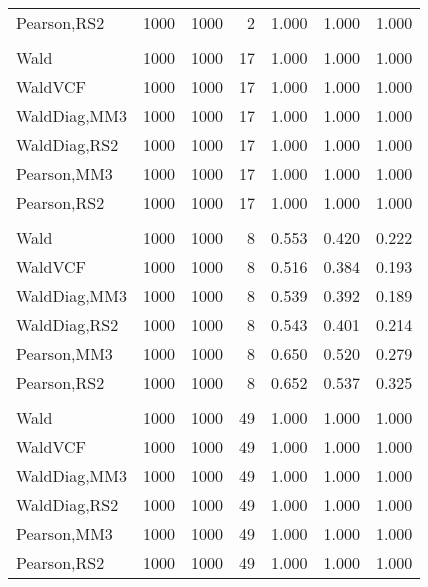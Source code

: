 \documentclass[
]{article}
\begin{document}
\begin{table}[H]
{\begin{tabular}[t]{lrrrrrr}
\hspace{1em}Pearson,RS2 & 1000 & 1000 & 2 & 1.000 & 1.000 & 1.000\\
\addlinespace[0.3em]
\multicolumn{7}{l}{\textbf{1F 15V}}\\
\hspace{1em}Wald & 1000 & 1000 & 17 & 1.000 & 1.000 & 1.000\\
\hspace{1em}WaldVCF & 1000 & 1000 & 17 & 1.000 & 1.000 & 1.000\\
\hspace{1em}WaldDiag,MM3 & 1000 & 1000 & 17 & 1.000 & 1.000 & 1.000\\
\hspace{1em}WaldDiag,RS2 & 1000 & 1000 & 17 & 1.000 & 1.000 & 1.000\\
\hspace{1em}Pearson,MM3 & 1000 & 1000 & 17 & 1.000 & 1.000 & 1.000\\
\hspace{1em}Pearson,RS2 & 1000 & 1000 & 17 & 1.000 & 1.000 & 1.000\\
\addlinespace[0.3em]
\multicolumn{7}{l}{\textbf{2F 10V}}\\
\hspace{1em}Wald & 1000 & 1000 & 8 & 0.553 & 0.420 & 0.222\\
\hspace{1em}WaldVCF & 1000 & 1000 & 8 & 0.516 & 0.384 & 0.193\\
\hspace{1em}WaldDiag,MM3 & 1000 & 1000 & 8 & 0.539 & 0.392 & 0.189\\
\hspace{1em}WaldDiag,RS2 & 1000 & 1000 & 8 & 0.543 & 0.401 & 0.214\\
\hspace{1em}Pearson,MM3 & 1000 & 1000 & 8 & 0.650 & 0.520 & 0.279\\
\hspace{1em}Pearson,RS2 & 1000 & 1000 & 8 & 0.652 & 0.537 & 0.325\\
\addlinespace[0.3em]
\multicolumn{7}{l}{\textbf{3F 15V}}\\
\hspace{1em}Wald & 1000 & 1000 & 49 & 1.000 & 1.000 & 1.000\\
\hspace{1em}WaldVCF & 1000 & 1000 & 49 & 1.000 & 1.000 & 1.000\\
\hspace{1em}WaldDiag,MM3 & 1000 & 1000 & 49 & 1.000 & 1.000 & 1.000\\
\hspace{1em}WaldDiag,RS2 & 1000 & 1000 & 49 & 1.000 & 1.000 & 1.000\\
\hspace{1em}Pearson,MM3 & 1000 & 1000 & 49 & 1.000 & 1.000 & 1.000\\
\hspace{1em}Pearson,RS2 & 1000 & 1000 & 49 & 1.000 & 1.000 & 1.000\\
\bottomrule
\end{tabular}}
\endgroup{}
\end{table}
\end{document}
